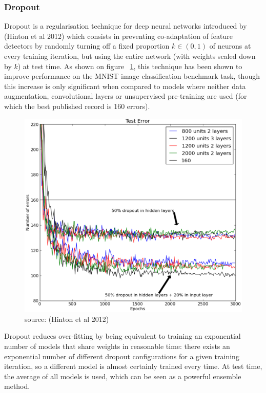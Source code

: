 \documentclass[a4paper,11pt]{article}
\begin{document}
\subsubsection{Dropout}

Dropout is a regularisation technique for deep neural networks introduced by (Hinton et al 2012) \cite{dropout} which consists in preventing co-adaptation of feature detectors by randomly turning off a fixed proportion $k \in (0,1)$ of neurons at every training iteration, but using the entire network (with weights scaled down by $k$) at test time. As shown on figure ~\ref{f16}, this technique has been shown to improve performance on the MNIST image classification benchmark task, though this increase is only significant when compared to models where neither data augmentation, convolutional layers or unsupervised pre-training are used (for which the best published record is 160 errors). \\

\begin{figure}[h!]
	\centering
	\includegraphics[scale=0.4]{images/dropout.png}
	\caption{source: (Hinton et al 2012)}
    \label{f16}
\end{figure}

Dropout reduces over-fitting by being equivalent to training an exponential number of models that share weights in reasonable time: there exists an exponential number of different dropout configurations for a given training iteration, so a different model is almost certainly trained every time. At test time, the average of all models is used, which can be seen as a powerful ensemble method. \\
\end{document}
